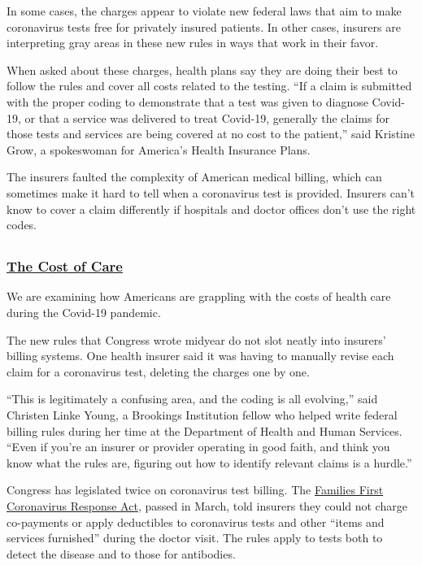 In some cases, the charges appear to violate new federal laws that aim
to make coronavirus tests free for privately insured patients. In other
cases, insurers are interpreting gray areas in these new rules in ways
that work in their favor.

When asked about these charges, health plans say they are doing their
best to follow the rules and cover all costs related to the testing.
``If a claim is submitted with the proper coding to demonstrate that a
test was given to diagnose Covid-19, or that a service was delivered to
treat Covid-19, generally the claims for those tests and services are
being covered at no cost to the patient,'' said Kristine Grow, a
spokeswoman for America's Health Insurance Plans.

The insurers faulted the complexity of American medical billing, which
can sometimes make it hard to tell when a coronavirus test is provided.
Insurers can't know to cover a claim differently if hospitals and doctor
offices don't use the right codes.

\subsection{}

\hypertarget{the-cost-of-care}{%
\subsubsection{\texorpdfstring{\href{https://www.nytimes3xbfgragh.onion/spotlight/new-york-shuttered}{The
Cost of Care}}{The Cost of Care}}\label{the-cost-of-care}}

We are examining how Americans are grappling with the costs of health
care during the Covid-19 pandemic.

The new rules that Congress wrote midyear do not slot neatly into
insurers' billing systems. One health insurer said it was having to
manually revise each claim for a coronavirus test, deleting the charges
one by one.

``This is legitimately a confusing area, and the coding is all
evolving,'' said Christen Linke Young, a Brookings Institution fellow
who helped write federal billing rules during her time at the Department
of Health and Human Services. ``Even if you're an insurer or provider
operating in good faith, and think you know what the rules are, figuring
out how to identify relevant claims is a hurdle.''

Congress has legislated twice on coronavirus test billing. The
\href{https://www.congress.gov/bill/116th-congress/house-bill/6201/text}{Families
First Coronavirus Response Act}, passed in March, told insurers they
could not charge co-payments or apply deductibles to coronavirus tests
and other ``items and services furnished'' during the doctor visit. The
rules apply to tests both to detect the disease and to those for
antibodies.

